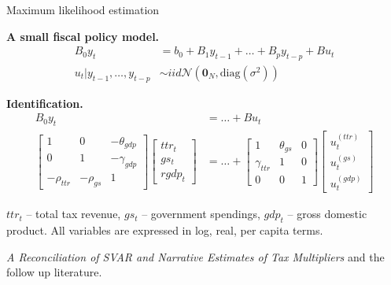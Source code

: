 \documentclass[notes,blackandwhite,mathsans,usenames,dvipsnames]{beamer}
\begin{document}
\begin{frame}{Maximum likelihood estimation}

\textbf{A small fiscal policy model.}\small
\begin{align*}
B_0 y_{t} &= b_0 + B_1 y_{t-1} + \dots + B_p y_{t-p} + B u_t\\
u_t|y_{t-1}, \dots, y_{t-p} &\sim iid \mathcal{N}\left( \mathbf{0}_N, \text{diag}\left(\sigma^2\right) \right)
\end{align*}

\normalsize\textbf{Identification.}\small
\begin{align*}
B_0 y_{t} &=  \dots  + B u_t\\
\begin{bmatrix} 1 &0& - \theta_{gdp} \\ 0 &1&-\gamma_{gdp} \\ -\rho_{ttr} &-\rho_{gs}&1\end{bmatrix}\begin{bmatrix}ttr_t \\gs_t \\ rgdp_t\end{bmatrix} &= \dots + \begin{bmatrix} 1 &\theta_{gs}& 0 \\ \gamma_{ttr} &1&0 \\ 0 &0&1\end{bmatrix}\begin{bmatrix}u_t^{(ttr)}\\u_t^{(gs)}\\u_t^{(gdp)} \end{bmatrix}
\end{align*}

\footnotesize
$ttr_t$ {\color{mcxs2}-- total tax revenue,} $gs_t$ {\color{mcxs2}-- government spendings,} $gdp_t$ {\color{mcxs2}-- gross domestic product. All variables are expressed in log, real, per capita terms.}

 \emph{A Reconciliation of SVAR and Narrative Estimates of Tax Multipliers} {\color{mcxs2}and the follow up literature.}
\end{frame}
\end{document}

